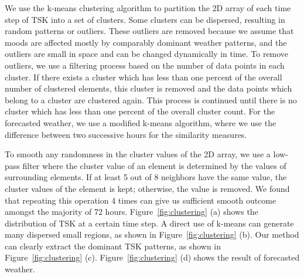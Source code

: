 We use the k-means clustering algorithm to partition the 2D array of each time step of TSK into a set of clusters. Some clusters can be dispersed, resulting in random patterns or outliers. These outliers are removed because we assume that moods are affected mostly by comparably dominant weather patterns, and the outliers are small in space and can be changed dynamically in time. To remove outliers, we use a filtering process based on the number of data points in each cluster. If there exists a cluster which has less than one percent of the overall number of clustered elements, this cluster is removed and the data points which belong to a cluster are clustered again. This process is continued until there is no cluster which has less than one percent of the overall cluster count. For the forecasted weather, we use a modified k-means algorithm, where we use the difference between two successive hours for the similarity measures.

%


To smooth any randomness in the cluster values of the 2D array, we use a low-pass filter where the cluster value of an element is determined by the values of surrounding elements.
If at least 5 out of 8 neighbors have the same value, the cluster values of the element is kept; otherwise, the value is removed. We found that repeating this operation 4 times can give us sufficient smooth outcome amongst the majority of 72 hours.
Figure~\ref{fig:clustering} (a) shows the distribution of TSK at a certain time step. A direct use of k-means can generate many dispersed small regions, as shown in Figure~\ref{fig:clustering} (b). Our method can clearly extract the dominant TSK patterns, as shown in Figure~\ref{fig:clustering} (c). Figure~\ref{fig:clustering} (d) shows the result of forecasted weather.

